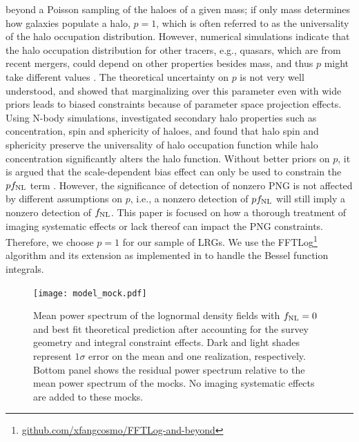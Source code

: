 beyond a Poisson sampling of the haloes of a given mass; if only mass determines how galaxies populate a halo, $p=1$, which is often referred to as the universality of the halo occupation distribution. However, numerical simulations indicate that the halo occupation distribution for other tracers, e.g., quasars, which are from recent mergers, could depend on other properties besides mass, and thus $p$ might take different values \citep[see, e.g.,][]{slosar2008constraints}. The theoretical uncertainty on $p$ is not very well understood, and \cite{2022JCAP...11..013B} showed that marginalizing over this parameter even with wide priors leads to biased constraints because of parameter space projection effects. Using N-body simulations, \cite{2023JCAP...01..023L} investigated secondary halo properties such as concentration, spin and sphericity of haloes, and found that halo spin and sphericity preserve the universality of halo occupation function while halo concentration significantly alters the halo function. Without better priors on $p$, it is argued that the scale-dependent bias effect can only  be used to constrain the $pf_{\rm NL}$ term \citep[see, e.g.,][]{2020JCAP...12..013B, 2020JCAP...12..031B}. However, the significance of detection of nonzero PNG is not affected by different assumptions on $p$, i.e., a nonzero detection of $pf_{\rm NL}$ will still imply a nonzero detection of $f_{\rm NL}$. This paper is focused on how a thorough treatment of imaging systematic effects or lack thereof can impact the PNG constraints. Therefore, we choose $p=1$ for our sample of LRGs. We use the FFTLog\footnote{\href{https://github.com/xfangcosmo/FFTLog-and-beyond}{github.com/xfangcosmo/FFTLog-and-beyond}} algorithm and its extension as implemented in \cite{fang2020beyond} to handle the Bessel function integrals.

 \begin{figure}
\centering
\texttt{[image: model\_mock.pdf]}
\caption{Mean power spectrum of the lognormal density fields with $f_{\rm NL}=0$ and best fit theoretical prediction after accounting for the survey geometry and integral constraint effects. Dark and light shades represent $1\sigma$ error on the mean and one realization, respectively. Bottom panel shows the residual power spectrum relative to the mean power spectrum of the mocks. No imaging systematic effects are added to these mocks.}\label{fig:model_mock}
\end{figure}

